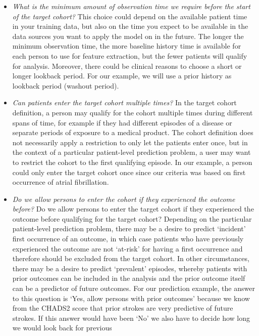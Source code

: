 \documentclass[
]{article}
\begin{document}
\begin{itemize}
\item
  \emph{What is the minimum amount of observation time we require before
  the start of the target cohort?} This choice could depend on the
  available patient time in your training data, but also on the time you
  expect to be available in the data sources you want to apply the model
  on in the future. The longer the minimum observation time, the more
  baseline history time is available for each person to use for feature
  extraction, but the fewer patients will qualify for analysis.
  Moreover, there could be clinical reasons to choose a short or longer
  lookback period. For our example, we will use a prior history as
  lookback period (washout period).
\item
  \emph{Can patients enter the target cohort multiple times?} In the
  target cohort definition, a person may qualify for the cohort multiple
  times during different spans of time, for example if they had
  different episodes of a disease or separate periods of exposure to a
  medical product. The cohort definition does not necessarily apply a
  restriction to only let the patients enter once, but in the context of
  a particular patient-level prediction problem, a user may want to
  restrict the cohort to the first qualifying episode. In our example, a
  person could only enter the target cohort once since our criteria was
  based on first occurrence of atrial fibrillation.
\item
  \emph{Do we allow persons to enter the cohort if they experienced the
  outcome before?} Do we allow persons to enter the target cohort if
  they experienced the outcome before qualifying for the target cohort?
  Depending on the particular patient-level prediction problem, there
  may be a desire to predict `incident' first occurrence of an outcome,
  in which case patients who have previously experienced the outcome are
  not `at-risk' for having a first occurrence and therefore should be
  excluded from the target cohort. In other circumstances, there may be
  a desire to predict `prevalent' episodes, whereby patients with prior
  outcomes can be included in the analysis and the prior outcome itself
  can be a predictor of future outcomes. For our prediction example, the
  answer to this question is `Yes, allow persons with prior outcomes'
  because we know from the CHADS2 score that prior strokes are very
  predictive of future strokes. If this answer would have been `No' we
  also have to decide how long we would look back for previous

\end{itemize}
\end{document}
